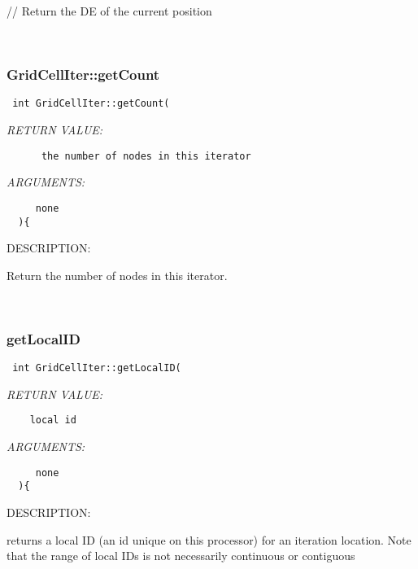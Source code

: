   // Return the DE of the current position
   
 
\mbox{}\hrulefill\
 
\subsubsection [GridCellIter::getCount] {GridCellIter::getCount}


  
\begin{verbatim} int GridCellIter::getCount(\end{verbatim}{\em RETURN VALUE:}
\begin{verbatim}      the number of nodes in this iterator\end{verbatim}{\em ARGUMENTS:}
\begin{verbatim}     none  
  ){\end{verbatim}
{\sf DESCRIPTION:\\ }


   Return the number of nodes in this iterator. 
   
 
\mbox{}\hrulefill\
 
\subsubsection [getLocalID] {getLocalID}


  
\begin{verbatim} int GridCellIter::getLocalID(\end{verbatim}{\em RETURN VALUE:}
\begin{verbatim}    local id\end{verbatim}{\em ARGUMENTS:}
\begin{verbatim}     none  
  ){\end{verbatim}
{\sf DESCRIPTION:\\ }


     returns a local ID (an id unique on this processor) for an iteration location. 
     Note that the range of local IDs is not necessarily continuous or contiguous
   
 
\mbox{}\hrulefill\
 
